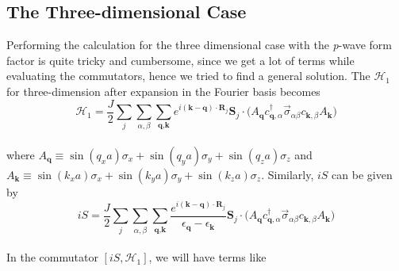 \documentclass{article}
\begin{document}
\subsection{The Three-dimensional Case}
Performing the calculation for the three dimensional case with the \textit{p}-wave form factor is quite tricky and cumbersome, since we get a lot of terms while evaluating the commutators, hence we tried to find a general solution.
The $\mathcal{H}_1$ for three-dimension after expansion in the Fourier basis becomes
\\
\begin{equation}
\mathcal{H}_1 =  \frac{J}{2} \sum_{j} \sum_{\alpha, \beta} \sum_{\textbf{q}, \textbf{k}} e^{i(\textbf{k} - \textbf{q}) \cdot \textbf{R}_j} \textbf{S}_j \cdot \Big(A_\textbf{q} c_{\textbf{q}, \alpha}^\dagger \vec{\sigma}_{\alpha \beta} c_{\textbf{k}, \beta} A_\textbf{k} \Big)
\end{equation}
\\
where $A_\textbf{q} \equiv \sin(q_xa) \sigma_x + \sin(q_ya) \sigma_y + \sin(q_za) \sigma_z$ and $A_\textbf{k} \equiv \sin(k_xa) \sigma_x + \sin(k_ya) \sigma_y + \sin(k_za) \sigma_z$. Similarly, $iS$ can be given by
\\
\begin{equation}
iS = \frac{J}{2} \sum_{j} \sum_{\alpha, \beta} \sum_{\textbf{q}, \textbf{k}} \frac{e^{i(\textbf{k} - \textbf{q}) \cdot \textbf{R}_j}}{\epsilon_{\textbf{q}} - \epsilon_{\textbf{k}}} \textbf{S}_j \cdot \Big(  A_\textbf{q} c_{\textbf{q}, \alpha}^\dagger \vec{\sigma}_{\alpha \beta} c_{\textbf{k}, \beta} A_\textbf{k} \Big)
\end{equation}
\\
In the commutator $[iS, \mathcal{H}_1]$, we will have terms like
\\
\end{document}

